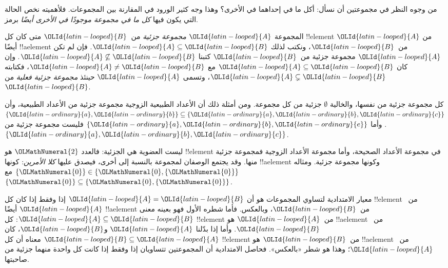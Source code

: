 \documentclass[../../../include/open-logic-section]{subfiles}
\begin{document}

\begin{explain}
من وجوه النظر في مجموعتين أن نسأل: أكل ما في إحداهما في الأخرى؟
وهذا وجه كثير الورود في المقارنة بين المجموعات. فلأهميته نخص الحالة
التي يكون فيها \emph{كل ما في مجموعة موجودًا في الأخرى أيضًا} برمز.
\end{explain}

\begin{defn}
المجموعة ${\OLId{latin-looped}{A}}$ \emph{مجموعة جزئية} من~${\OLId{latin-looped}{B}}$ متى كان كل !!{element} من ${\OLId{latin-looped}{A}}$
أيضًا !!a{element} من~${\OLId{latin-looped}{B}}$، ونكتب لذلك ${\OLId{latin-looped}{A}} \subseteq {\OLId{latin-looped}{B}}$.
فإن لم تكن ${\OLId{latin-looped}{A}}$ مجموعة جزئية من~${\OLId{latin-looped}{B}}$ كتبنا ${\OLId{latin-looped}{A}} \not\subseteq {\OLId{latin-looped}{B}}$.
وإن كان ${\OLId{latin-looped}{A}} \subseteq {\OLId{latin-looped}{B}}$ مع ${\OLId{latin-looped}{A}} \neq {\OLId{latin-looped}{B}}$، فكتابته ${\OLId{latin-looped}{A}} \subsetneq {\OLId{latin-looped}{B}}$،
وتسمى ${\OLId{latin-looped}{A}}$ حينئذ \emph{مجموعة جزئية فعلية} من ${\OLId{latin-looped}{B}}$.
\end{defn}

\begin{ex}
كل مجموعة جزئية من نفسها، والخالية $\emptyset$ جزئية من كل مجموعة.
ومن أمثلة ذلك أن الأعداد الطبيعية الزوجية مجموعة جزئية من الأعداد
الطبيعية، وأن $\{ {\OLId{latin-ordinary}{a}}, {\OLId{latin-ordinary}{b}} \} \subseteq \{ {\OLId{latin-ordinary}{a}}, {\OLId{latin-ordinary}{b}}, {\OLId{latin-ordinary}{c}} \}$.
وأما $\{ {\OLId{latin-ordinary}{a}}, {\OLId{latin-ordinary}{b}}, {\OLId{latin-ordinary}{e}}
\}$ فليست مجموعة جزئية من $\{ {\OLId{latin-ordinary}{a}}, {\OLId{latin-ordinary}{b}}, {\OLId{latin-ordinary}{c}} \}$.
\end{ex}

\begin{ex}
ليست العضوية هي الجزئية: فالعدد ${\OLMathNumeral{2}}$ هو !!{element} في مجموعة الأعداد
الصحيحة، وأما مجموعة الأعداد الزوجية فمجموعة جزئية منها. وقد يجتمع
الوصفان لمجموعة بالنسبة إلى أخرى، فيصدق عليها \emph{كلا الأمرين}: كونها
!!a{element} وكونها مجموعة جزئية. ومثاله $\{{\OLMathNumeral{0}}\} \in \{{\OLMathNumeral{0}}, \{{\OLMathNumeral{0}}\}\}$ مع $\{{\OLMathNumeral{0}}\} \subseteq \{{\OLMathNumeral{0}},
\{{\OLMathNumeral{0}}\}\}$.
\end{ex}

معيار الامتدادية لتساوي المجموعات هو أن ${\OLId{latin-looped}{A}} = {\OLId{latin-looped}{B}}$ إذا وفقط إذا كان
كل !!{element} من~${\OLId{latin-looped}{A}}$ أيضًا !!a{element} من~${\OLId{latin-looped}{B}}$، وبالعكس.
فأما شطره الأول فهو بعينه معنى ${\OLId{latin-looped}{A}} \subseteq {\OLId{latin-looped}{B}}$: كل !!{element}
من~${\OLId{latin-looped}{A}}$ هو !!a{element} من~${\OLId{latin-looped}{B}}$. وأما إذا بدّلنا ${\OLId{latin-looped}{A}}$ و${\OLId{latin-looped}{B}}$، كان
${\OLId{latin-looped}{B}} \subseteq {\OLId{latin-looped}{A}}$ معناه أن كل !!{element} من~${\OLId{latin-looped}{B}}$ هو !!a{element}
من~${\OLId{latin-looped}{A}}$؛ وهذا هو شطر «بالعكس». فحاصل الامتدادية أن المجموعتين تتساويان
إذا وفقط إذا كانت كل واحدة منهما جزئية من صاحبتها.
\end{document}
